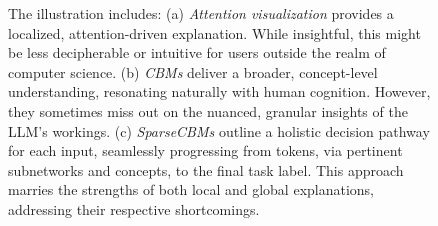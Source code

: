 \documentclass[letterpaper]{article} %
\begin{document}
\begin{figure}[t]
		\centering
{}
\caption{The illustration includes:
(a) \textit{Attention visualization} provides a localized, attention-driven explanation. While insightful, this might be less decipherable or intuitive for users outside the realm of computer science.
(b) \textit{CBMs} deliver a broader, concept-level understanding, resonating naturally with human cognition. However, they sometimes miss out on the nuanced, granular insights of the LLM's workings.
(c) \textit{SparseCBMs} outline a holistic decision pathway for each input, seamlessly progressing from tokens, via pertinent subnetworks and concepts, to the final task label. This approach marries the strengths of both local and global explanations, addressing their respective shortcomings.}
\label{fig:teaser}
	\end{figure}
\end{document}
